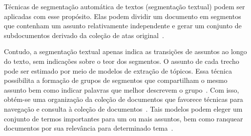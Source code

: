 


Técnicas de segmentação automática de textos (segmentação textual) podem ser aplicadas com esse propósito. Elas podem dividir um documento em segmentos que contenham um assunto relativamente independente e gerar um conjunto de subdocumentos derivado da coleção de atas original~\cite{Aggarwal2018, bokaei2015a, sakahara2014a, misra2009a, Eis2008}.




Contudo, a segmentação textual apenas indica as transições de assuntos ao longo do texto,  sem indicações sobre o teor dos segmentos. O assunto de cada trecho pode ser estimado por meio de modelos de extração de tópicos. Essa técnica possibilita a formação de grupos de segmentos que compartilham o mesmo assunto bem como indicar palavras que melhor descrevem o grupo~\cite{Wei2007}. Com isso, obtém-se uma organização da coleção de documentos que favorece técnicas para navegação e consulta à coleção de documentos~\cite{Maracini2010}. Tais modelos podem eleger um conjunto de termos importantes para um ou mais assuntos, bem como ranquear documentos por sua relevância para determinado tema~\cite{Faleiros2016,Xing2009}.








